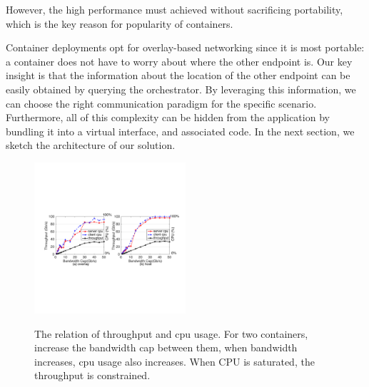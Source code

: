 However, the high performance must achieved without sacrificing portability,
which is the key reason for popularity of containers. 

Container deployments opt for overlay-based networking since it is most
portable: a container does not have to worry about where the other endpoint is.
Our key insight is that the information about the location of the other endpoint
can be easily obtained by querying the orchestrator. By leveraging this
information, we can choose the right communication paradigm for the specific
scenario. Furthermore, all of this complexity can be hidden from the application
by bundling it into a virtual interface, and associated code. In the next
section, we sketch the architecture of our solution.

      \begin{figure}[ht]
      \centering 
      \includegraphics[width=0.5\textwidth]{figures/motivation/mot_bw_cpu.pdf}      
      \label{fig:mot_bw_cpu}
      \caption{The relation of throughput and cpu usage. For two containers, 
      increase the bandwidth cap between them, when bandwidth increases, 
      cpu usage also increases. When CPU is saturated, the throughput is constrained.} 
      \end{figure}


